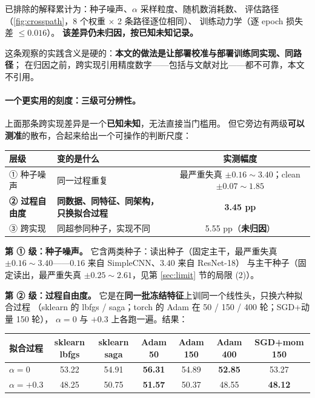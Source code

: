\documentclass[11pt,a4paper]{ctexart}
\begin{document}
已排除的解释累计为：种子噪声、$\alpha$ 采样粒度、随机数消耗数、
评估路径（\cref{fig:crosspath}，8 个权重 $\times$ 2 条路径逐位相同）、
训练动力学（逐 epoch 损失差 $\le0.016$）。
\textbf{该差异仍未归因，按已知未知记录。}

这条观察的实践含义是硬的：\textbf{本文的做法是让部署校准与部署训练同实现、同路径}；
在归因之前，跨实现引用精度数字——包括与文献对比——都不可靠，本文不引用。

\paragraph{一个更实用的刻度：三级可分辨性。}
上面那条跨实现差异是一个\textbf{已知未知}，无法直接当门槛用。
但它旁边有两级\textbf{可以测准}的散布，合起来给出一个可操作的判断尺度：

\begin{center}
\small
\begin{tabular}{llc}
\toprule
层级 & 变的是什么 & 实测幅度 \\
\midrule
① 种子噪声 & 同一过程重复 & 最严重失真 $\pm0.16\sim3.40$；clean $\pm0.07\sim1.85$ \\
\textbf{② 过程自由度} & \textbf{同数据、同特征、同架构，只换拟合过程} & \textbf{3.45 pp} \\
③ 跨实现 & 同超参同种子，实现不同 & 5.55 pp（\textbf{未归因}）\\
\bottomrule
\end{tabular}
\end{center}

\textbf{第 ① 级：种子噪声。}
它含两类种子：读出种子（固定主干，最严重失真 $\pm0.16\sim3.40$——$0.16$ 来自 SimpleCNN、$3.40$ 来自 ResNet-18）
与主干种子（固定读出，最严重失真 $\pm0.25\sim2.61$，见第 \ref{sec:limit} 节的局限 (2)）。

\textbf{第 ② 级：过程自由度。}
它是在\textbf{同一批冻结特征}上训同一个线性头，只换六种拟合过程
（sklearn 的 lbfgs / saga；torch 的 Adam 在 50 / 150 / 400 轮；SGD+动量 150 轮），
$\alpha=0$ 与 $+0.3$ 上各跑一遍。结果：

\begin{center}
\small
\begin{tabular}{lcccccc}
\toprule
拟合过程 & sklearn lbfgs & sklearn saga & Adam 50 & Adam 150 & Adam 400 & SGD+mom 150 \\
\midrule
$\alpha=0$ & 53.22 & 54.91 & \textbf{56.31} & 54.89 & \textbf{52.85} & 53.27 \\
$\alpha=+0.3$ & 48.25 & 50.75 & \textbf{51.57} & 50.37 & 48.55 & \textbf{48.12} \\
\bottomrule
\end{tabular}
\end{center}
\end{document}
